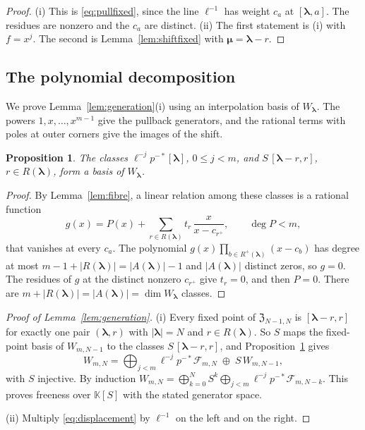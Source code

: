 \documentclass[11pt]{amsart}
\newtheorem{proposition}[theorem]{Proposition}
\theoremstyle{definition}
\theoremstyle{remark}
\newcommand{\K}{\mathbb K}                       %
\newcommand{\bl}{{\boldsymbol{\lambda}}}         %
\newcommand{\bmu}{{\boldsymbol{\mu}}}
\newcommand{\Add}[1]{A(#1)}                      %
\newcommand{\Rem}[1]{R(#1)}                      %
\newcommand{\ceig}[1]{c_{#1}}                    %
\newcommand{\bplus}[1]{{#1}^{+}}                 %
\newcommand{\Remp}[1]{R^{+}(#1)}                 %
\newcommand{\Wfib}[1]{W_{#1}}                    %
\newcommand{\Wdeg}[2]{W_{#1,#2}}                 %
\newcommand{\Fdeg}[2]{\mathcal F_{#1,#2}}         %
\newcommand{\Zc}{\mathfrak Z}
\newcommand{\fix}[1]{[#1]}                       %
\newcommand{\pt}[2]{[#1,#2]}                     %
\newcommand{\taut}{\ell}                         %
\newcommand{\pulm}{p^{-*}}                       %
\newcommand{\Shift}{S}                           %
\begin{document}
\begin{proof}
(i) This is \eqref{eq:pullfixed}, since the line \(\taut^{-1}\) has weight \(\ceig{a}\) at
\(\pt{\bl}{a}\). The residues are nonzero and the \(\ceig{a}\) are distinct.
(ii) The first statement is (i) with \(f=x^j\). The second is
Lemma~\ref{lem:shiftfixed} with \(\bmu=\bl-r\).
\end{proof}

\subsection{The polynomial decomposition}\label{sec:freeness}

We prove Lemma~\ref{lem:generation}(i) using an interpolation basis of \(\Wfib{\bl}\).
The powers \(1,x,\dots,x^{m-1}\) give the pullback
generators, and the rational terms with poles at outer corners give the images of
the shift.

\begin{proposition}\label{prop:free}
The classes \(\taut^{-j}\pulm\fix{\bl}\), \(0\leq j<m\), and
\(\Shift\,\pt{\bl-r}{r}\), \(r\in\Rem{\bl}\), form a basis of \(\Wfib{\bl}\).
\end{proposition}

\begin{proof}
By Lemma~\ref{lem:fibre}, a linear relation among these classes is a
rational function
\[
 g(x)=P(x)+\sum_{r\in\Rem{\bl}}t_r\,\frac{x}{x-\ceig{\bplus{r}}},\qquad\deg P<m,
\]
that vanishes at every \(\ceig{a}\). The polynomial
\(g(x)\prod_{b\in\Remp{\bl}}(x-\ceig{b})\) has degree at most
\(m-1+|\Rem{\bl}|=|\Add{\bl}|-1\) and \(|\Add{\bl}|\) distinct zeros, so \(g=0\).
The residues of \(g\) at the distinct nonzero \(\ceig{\bplus{r}}\) give \(t_r=0\),
and then \(P=0\). There are \(m+|\Rem{\bl}|=|\Add{\bl}|=\dim\Wfib{\bl}\) classes.
\end{proof}

\begin{proof}[Proof of Lemma~\ref{lem:generation}]
(i) Every fixed point of \(\Zc_{N-1,N}\) is \(\pt{\bl-r}{r}\) for exactly one pair
\((\bl,r)\) with \(|\bl|=N\) and \(r\in\Rem{\bl}\). So \(\Shift\) maps the
fixed-point basis of \(\Wdeg{m}{N-1}\) to the classes \(\Shift\,\pt{\bl-r}{r}\),
and Proposition~\ref{prop:free} gives
\[
 \Wdeg{m}{N}=\bigoplus_{j<m}\taut^{-j}\pulm\Fdeg{m}{N}\;\oplus\;\Shift\,\Wdeg{m}{N-1},
\]
with \(\Shift\) injective. By induction
\(\Wdeg{m}{N}=\bigoplus_{k=0}^N\Shift^k\bigoplus_{j<m}\taut^{-j}\pulm\Fdeg{m}{N-k}\).
This proves freeness over \(\K[\Shift]\) with the stated generator space.

(ii) Multiply \eqref{eq:displacement} by \(\taut^{-1}\) on the left and on the right.
\end{proof}
\end{document}
